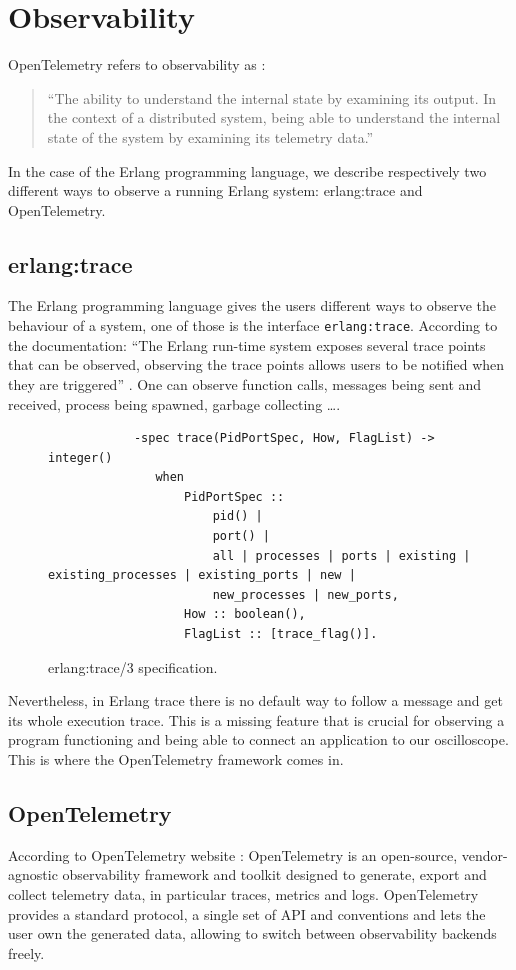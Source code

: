 \section{Observability}
    OpenTelemetry refers to observability as \cite{otel-o}:
    \begin{quote}
 ``The ability to understand the internal state by examining its output. In the context of a distributed system, being able to understand the internal state of the system by examining its telemetry data.''
    \end{quote}
    In the case of the Erlang programming language, we describe respectively two different ways to observe a running Erlang system: erlang:trace and OpenTelemetry.
    
    \subsection{erlang:trace}
        The Erlang programming language gives the users different ways to observe the behaviour of a system, one of those is the interface \texttt{erlang:trace}. According to the documentation: ``The Erlang run-time system exposes several trace points that can be observed, observing the trace points allows users to be notified when they are triggered'' \cite{erl-t}. One can observe function calls, messages being sent and received, process being spawned, garbage collecting \dots. 
        \begin{figure}[!ht]
        \centering
        \begin{verbatim}
            -spec trace(PidPortSpec, How, FlagList) -> integer()
               when
                   PidPortSpec ::
                       pid() |
                       port() |
                       all | processes | ports | existing | existing_processes | existing_ports | new |
                       new_processes | new_ports,
                   How :: boolean(),
                   FlagList :: [trace_flag()].
        \end{verbatim}
        \caption{erlang:trace/3 specification.}
\end{figure}

    Nevertheless, in Erlang trace there is no default way to follow a message and get its whole execution trace. This is a missing feature that is crucial for observing a program functioning and being able to connect an application to our oscilloscope.  This is where the OpenTelemetry framework comes in.

\subsection{OpenTelemetry}
    According to OpenTelemetry website \cite{otel-o}: OpenTelemetry is an open-source, vendor-agnostic observability framework and toolkit designed to generate, export and collect telemetry data, in particular traces, metrics and logs. OpenTelemetry provides a standard protocol, a single set of API and conventions and lets the user own the generated data, allowing to switch between observability backends freely.
   

